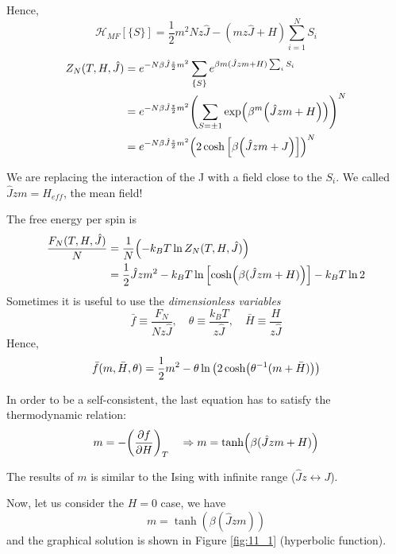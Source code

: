 \documentclass[../main/main.tex]{subfiles}
\begin{document}
Hence,
\begin{equation}
  \mathcal{H}_{MF} [ \{ S \}  ] = \frac{1}{2} m^2 N z \hat{J} - (m z \hat{J} + H ) \sum_{i=1}^{N} S_i
\end{equation}
\begin{equation}
\begin{split}
  Z_N (T,H,\hat{J} ) &= e^{-N \beta \hat{J} \frac{z}{2} m^2 }  \sum_{\{ S \}  }^{} e^{\beta m (\hat{J}zm+H )\sum_{i}^{} S_i }   \\
  & = e^{-N \beta \hat{J} \frac{z}{2} m^2 } \qty(\sum_{S = \pm 1}^{} \exp (\beta ^m \qty(\hat{J}zm+H ) )   )^N \\
  & = e^{-N \beta \hat{J} \frac{z}{2} m^2 } \qty(2 \cosh \qty[\beta \qty(\hat{J}zm+J ) ] )^N
\end{split}
\end{equation}
\begin{remark}
We are replacing the interaction of the J with a field close to the \( S_i \). We called \( \hat{J} z m = H_{eff}  \), the mean field!
\end{remark}

The free energy per spin is
\begin{equation}
\begin{split}
  \frac{F_N (T,H,\hat{J} )}{N} & = \frac{1}{N} \qty(-k_B T \ln{Z_N(T,H,\hat{J} )} ) \\
  & = \frac{1}{2} \hat{J} z m^2 - k_B T \ln{\qty[\cosh(\beta (\hat{J}zm+H ))] } - k_B T \ln{2}
\end{split}
\end{equation}
Sometimes it is useful to use the \emph{dimensionless variables}
\begin{equation}
  \bar{f} \equiv \frac{F_N}{N z \hat{J} }, \quad \theta \equiv \frac{k_B T}{z \hat{J} }, \quad \bar{H} \equiv \frac{H}{z \hat{J} }
\end{equation}
Hence,
\begin{equation}
  \bar{f} (m, \bar{H}, \theta  ) = \frac{1}{2}m^2 - \theta \ln{\qty(2 \cosh (\theta ^{-1}(m+\bar{H} ))) }
\end{equation}

In order to be a self-consistent, the last equation has to satisfy the  thermodynamic relation:
\begin{equation}
  m = - \qty( \pdv{f}{H})_T \quad \Rightarrow   m = \tanh (\beta (\hat{J}z m + H  ))
\end{equation}
\begin{remark}
The results of \( m \)  is similar to the Ising with infinite range (\( \hat{J}z \leftrightarrow J  \)).
\end{remark}
Now, let us consider the \( H=0 \) case, we have
\begin{equation}
  m =  \tanh (\beta (\hat{J}z m ))
\end{equation}
and the graphical solution is shown in Figure \ref{fig:11_1} (hyperbolic function).
\end{document}
